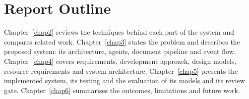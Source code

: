 \section{Report Outline}
Chapter~\ref{chap2} reviews the techniques behind each part of the system and compares related work. Chapter~\ref{chap3} states the problem and describes the proposed system: its architecture, agents, document pipeline and event flow. Chapter~\ref{chap4} covers requirements, development approach, design models, resource requirements and system architecture. Chapter~\ref{chap5} presents the implemented system, its testing and the evaluation of its models and its review gate. Chapter~\ref{chap6} summarises the outcomes, limitations and future work.
